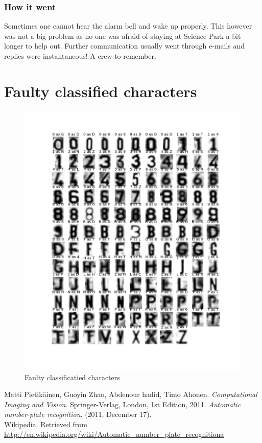 \documentclass[a4paper]{article}
\begin{document}
\subsubsection*{How it went}

Sometimes one cannot hear the alarm bell and wake up properly. This however was
not a big problem as no one was afraid of staying at Science Park a bit longer
to help out. Further communication usually went through e-mails and replies
were instantaneous! A crew to remember.

\appendix

\section{Faulty classified characters}
\label{faucla}

\begin{figure}[H]
    \hspace{-2cm}
    \includegraphics[scale=0.5]{faulty.png}
    \caption{Faulty classificatied characters}
\end{figure}

\begin{thebibliography}{9}
        Matti Pietik\"ainen, Guoyin Zhao, Abdenour hadid,
        Timo Ahonen.
        \emph{Computational Imaging and Vision}.
        Springer-Verlag, London,
        1st Edition,
        2011.
        \emph{Automatic number-plate recognition}. (2011, December 17). \\
        Wikipedia.
        Retrieved from
        \url{http://en.wikipedia.org/wiki/Automatic_number_plate_recognitiona}
\end{thebibliography}
\end{document}
